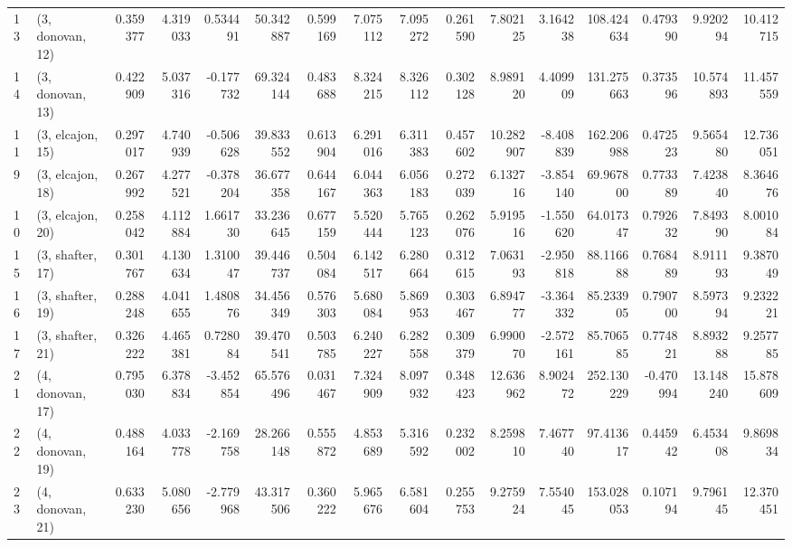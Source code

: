 \begin{tabular}{llrrrrrrrrrrrrrr}
13 &  (3, donovan, 12) &   0.359377 &  4.319033 &  0.534491 &   50.342887 &  0.599169 &   7.075112 &   7.095272 &  0.261590 &   7.802125 &  3.164238 &  108.424634 &  0.479390 &   9.920294 &  10.412715 \\
14 &  (3, donovan, 13) &   0.422909 &  5.037316 & -0.177732 &   69.324144 &  0.483688 &   8.324215 &   8.326112 &  0.302128 &   8.989120 &  4.409909 &  131.275663 &  0.373596 &  10.574893 &  11.457559 \\
11 &  (3, elcajon, 15) &   0.297017 &  4.740939 & -0.506628 &   39.833552 &  0.613904 &   6.291016 &   6.311383 &  0.457602 &  10.282907 & -8.408839 &  162.206988 &  0.472523 &   9.565480 &  12.736051 \\
9  &  (3, elcajon, 18) &   0.267992 &  4.277521 & -0.378204 &   36.677358 &  0.644167 &   6.044363 &   6.056183 &  0.272039 &   6.132716 & -3.854140 &   69.967800 &  0.773389 &   7.423840 &   8.364676 \\
10 &  (3, elcajon, 20) &   0.258042 &  4.112884 &  1.661730 &   33.236645 &  0.677159 &   5.520444 &   5.765123 &  0.262076 &   5.919516 & -1.550620 &   64.017347 &  0.792632 &   7.849390 &   8.001084 \\
15 &  (3, shafter, 17) &   0.301767 &  4.130634 &  1.310047 &   39.446737 &  0.504084 &   6.142517 &   6.280664 &  0.312615 &   7.063193 & -2.950818 &   88.116688 &  0.768489 &   8.911193 &   9.387049 \\
16 &  (3, shafter, 19) &   0.288248 &  4.041655 &  1.480876 &   34.456349 &  0.576303 &   5.680084 &   5.869953 &  0.303467 &   6.894777 & -3.364332 &   85.233905 &  0.790700 &   8.597394 &   9.232221 \\
17 &  (3, shafter, 21) &   0.326222 &  4.465381 &  0.728084 &   39.470541 &  0.503785 &   6.240227 &   6.282558 &  0.309379 &   6.990070 & -2.572161 &   85.706585 &  0.774821 &   8.893288 &   9.257785 \\
21 &  (4, donovan, 17) &   0.795030 &  6.378834 & -3.452854 &   65.576496 &  0.031467 &   7.324909 &   8.097932 &  0.348423 &  12.636962 &  8.902472 &  252.130229 & -0.470994 &  13.148240 &  15.878609 \\
22 &  (4, donovan, 19) &   0.488164 &  4.033778 & -2.169758 &   28.266148 &  0.555872 &   4.853689 &   5.316592 &  0.232002 &   8.259810 &  7.467740 &   97.413617 &  0.445942 &   6.453408 &   9.869834 \\
23 &  (4, donovan, 21) &   0.633230 &  5.080656 & -2.779968 &   43.317506 &  0.360222 &   5.965676 &   6.581604 &  0.255753 &   9.275924 &  7.554045 &  153.028053 &  0.107194 &   9.796145 &  12.370451 \\

\end{tabular}
